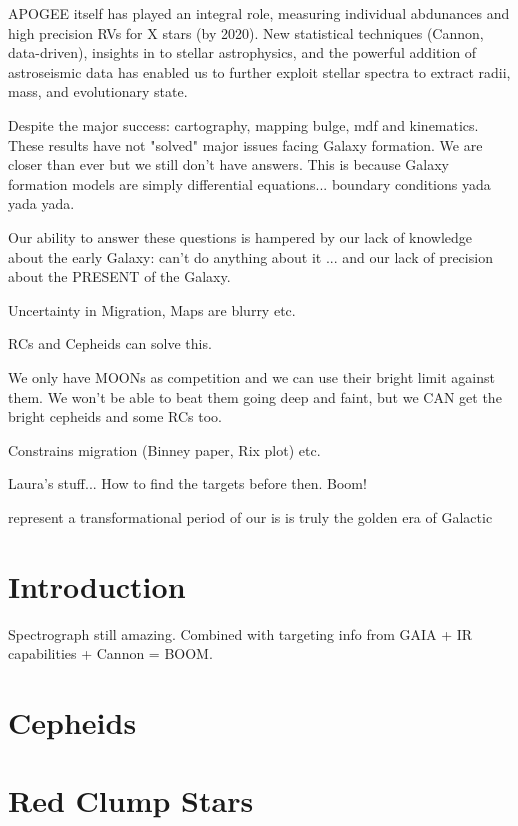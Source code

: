 \documentclass[11pt,preprint]{aastex}
\begin{document}
APOGEE itself has played an integral role, measuring individual abdunances and high precision RVs for X stars (by 2020). New statistical techniques (Cannon, data-driven), insights in to stellar astrophysics, and the powerful addition of astroseismic data has enabled us to further exploit stellar spectra to extract radii, mass, and evolutionary state.

Despite the major success: cartography, mapping bulge, mdf and kinematics. These results have not "solved" major issues facing Galaxy formation. We are closer than ever but we still don't have answers. This is because Galaxy formation models are simply differential equations... boundary conditions yada yada yada.

Our ability to answer these questions is hampered by our lack of knowledge about the early Galaxy: can't do anything about it ... and our lack of precision about the PRESENT of the Galaxy. 

Uncertainty in Migration, Maps are blurry etc. 

RCs and Cepheids can solve this.

We only have MOONs as competition and we can use their bright limit  against them. We won't be able to beat them going deep and faint, but we CAN get the bright cepheids and some RCs too.

Constrains migration (Binney paper, Rix plot)  etc.


Laura's stuff... How to  find the targets before then. Boom!




represent a transformational period of our is is truly the golden era of Galactic
\section{Introduction}
\label{sec:intro}
Spectrograph still amazing. Combined with targeting info from GAIA + IR capabilities + Cannon = BOOM. 

\section{Cepheids}
\label{sec:cepheids}

\section{Red Clump Stars}
\label{sec:rcs}
\end{document}
